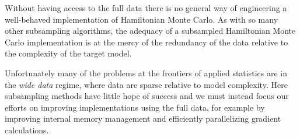 \documentclass{article}
\begin{document}
Without having access to the full data there is no general way of engineering 
a well-behaved implementation of Hamiltonian Monte Carlo.  As with so many
other subsampling algorithms, the adequacy of a subsampled Hamiltonian
Monte Carlo implementation is at the mercy of the redundancy of the data
relative to the complexity of the target model.

Unfortunately many of the problems at the frontiers of applied statistics are 
in the \textit{wide data} regime, where data are sparse relative to model 
complexity.  Here subsampling methods have little hope of success and
we must instead focus our efforts on improving implementations using
the full data, for example by improving internal memory management and 
efficiently parallelizing gradient calculations.





\end{document}
